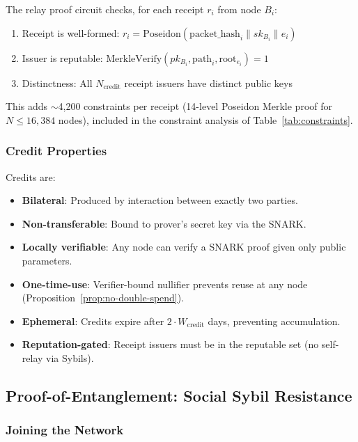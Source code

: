 \documentclass[11pt,a4paper]{article}
\begin{document}
The relay proof circuit checks, for each receipt $r_i$ from node $B_i$:
\begin{enumerate}[nosep]
    \item Receipt is well-formed: $r_i = \text{Poseidon}(\text{packet\_hash}_i \| sk_{B_i} \| e_i)$
    \item Issuer is reputable: $\text{MerkleVerify}(pk_{B_i}, \text{path}_i, \text{root}_{e_i}) = 1$
    \item Distinctness: All $N_{\text{credit}}$ receipt issuers have distinct public keys
\end{enumerate}

This adds $\sim$4,200 constraints per receipt (14-level Poseidon Merkle proof for $N \leq 16{,}384$ nodes), included in the constraint analysis of Table~\ref{tab:constraints}.

\subsubsection{Credit Properties}

Credits are:
\begin{itemize}[nosep]
    \item \textbf{Bilateral}: Produced by interaction between exactly two parties.
    \item \textbf{Non-transferable}: Bound to prover's secret key via the SNARK.
    \item \textbf{Locally verifiable}: Any node can verify a SNARK proof given only public parameters.
    \item \textbf{One-time-use}: Verifier-bound nullifier prevents reuse at any node (Proposition~\ref{prop:no-double-spend}).
    \item \textbf{Ephemeral}: Credits expire after $2 \cdot W_{\text{credit}}$ days, preventing accumulation.
    \item \textbf{Reputation-gated}: Receipt issuers must be in the reputable set (no self-relay via Sybils).
\end{itemize}

\subsection{Proof-of-Entanglement: Social Sybil Resistance}
\label{sec:entanglement}

\subsubsection{Joining the Network}
\end{document}
